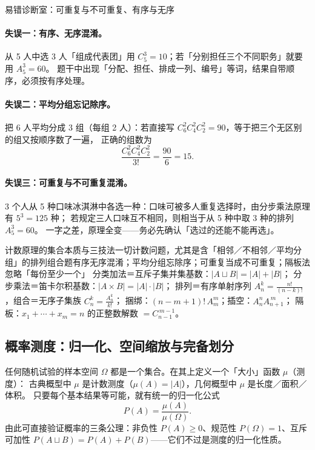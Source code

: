 \begin{explore}
\begin{commonerror}{易错诊断室：可重复与不可重复、有序与无序}
\paragraph{失误一：有序、无序混淆。}
从 5 人中选 3 人「组成代表团」用 $C_5^3=10$；若「分别担任三个不同职务」就要用 $A_5^3=60$。
题干中出现「分配、担任、排成一列、编号」等词，结果自带顺序，必须按有序处理。
\paragraph{失误二：平均分组忘记除序。}
把 6 人平均分成 3 组（每组 2 人）：若直接写 $C_6^2C_4^2C_2^2=90$，等于把三个无区别的组又按顺序数了一遍，
正确的组数为
\[
  \frac{C_6^2C_4^2C_2^2}{3!}=\frac{90}{6}=15 .
\]
\paragraph{失误三：可重复与不可重复混淆。}
3 个人从 5 种口味冰淇淋中各选一种：口味可被多人重复选择时，由分步乘法原理有 $5^3=125$ 种；
若规定三人口味互不相同，则相当于从 5 种中取 3 种的排列 $A_5^3=60$。
一字之差，原理全变——务必先确认「选过的还能不能再选」。
\end{commonerror}

\begin{conccard}[一级]{计数原理的集合本质与三技法}{一切计数问题，尤其是含「相邻／不相邻／平均分组」的排列组合题}{有序无序混淆；平均分组忘除序；可重复当成不可重复；隔板法忽略「每份至少一个」}
分类加法＝互斥子集并集基数：$|A\sqcup B|=|A|+|B|$；
分步乘法＝笛卡尔积基数：$|A\times B|=|A|\cdot|B|$；
排列＝有序单射序列 $A_n^k=\frac{n!}{(n-k)!}$，组合＝无序子集族 $C_n^k=\frac{A_n^k}{k!}$；
捆绑：$(n-m+1)!\,A_m^m$；插空：$A_n^nA_{n+1}^{\,m}$；
隔板：$x_1+\cdots+x_m=n$ 的正整数解数 $=C_{n-1}^{\,m-1}$。
\end{conccard}

\subsection{概率测度：归一化、空间缩放与完备划分}


任何随机试验的样本空间 $\Omega$ 都是一个集合。在其上定义一个「大小」函数 $\mu$（测度）：
古典概型中 $\mu$ 是计数测度（$\mu(A)=|A|$），几何概型中 $\mu$ 是长度／面积／体积。
只要每个基本结果等可能，就有统一的归一化公式
\[
  P(A)=\frac{\mu(A)}{\mu(\Omega)}.
\]
由此可直接验证概率的三条公理：非负性 $P(A)\ge0$、规范性 $P(\Omega)=1$、互斥可加性 $P(A\sqcup B)=P(A)+P(B)$——它们不过是测度的归一化性质。


\end{explore}
